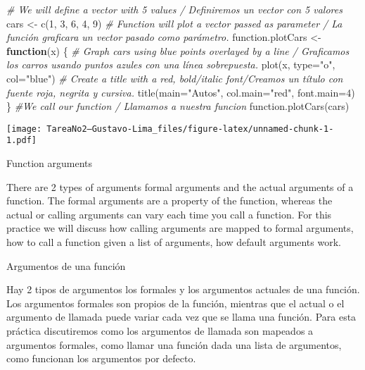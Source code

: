 \documentclass[
]{article}
\newenvironment{Shaded}{\begin{snugshade}}{\end{snugshade}}
\newcommand{\AttributeTok}[1]{\textcolor[rgb]{0.77,0.63,0.00}{#1}}
\newcommand{\CommentTok}[1]{\textcolor[rgb]{0.56,0.35,0.01}{\textit{#1}}}
\newcommand{\ControlFlowTok}[1]{\textcolor[rgb]{0.13,0.29,0.53}{\textbf{#1}}}
\newcommand{\DecValTok}[1]{\textcolor[rgb]{0.00,0.00,0.81}{#1}}
\newcommand{\FunctionTok}[1]{\textcolor[rgb]{0.00,0.00,0.00}{#1}}
\newcommand{\NormalTok}[1]{#1}
\newcommand{\OtherTok}[1]{\textcolor[rgb]{0.56,0.35,0.01}{#1}}
\newcommand{\StringTok}[1]{\textcolor[rgb]{0.31,0.60,0.02}{#1}}
\begin{document}
\begin{Shaded}
\begin{Highlighting}[]
\CommentTok{\# We will define a vector with 5 values / Definiremos un vector con 5 valores}
\NormalTok{cars }\OtherTok{\textless{}{-}} \FunctionTok{c}\NormalTok{(}\DecValTok{1}\NormalTok{, }\DecValTok{3}\NormalTok{, }\DecValTok{6}\NormalTok{, }\DecValTok{4}\NormalTok{, }\DecValTok{9}\NormalTok{)}
\CommentTok{\# Function will plot a vector passed as parameter / La función graficara un vector pasado como parámetro.}
\NormalTok{function.plotCars }\OtherTok{\textless{}{-}} \ControlFlowTok{function}\NormalTok{(x) }
\NormalTok{\{}
  \CommentTok{\# Graph cars using blue points overlayed by a line / Graficamos los carros usando puntos azules con una línea sobrepuesta.}
  \FunctionTok{plot}\NormalTok{(x, }\AttributeTok{type=}\StringTok{"o"}\NormalTok{, }\AttributeTok{col=}\StringTok{"blue"}\NormalTok{)}
  \CommentTok{\# Create a title with a red, bold/italic font/Creamos un título con fuente roja, negrita y cursiva.}
  \FunctionTok{title}\NormalTok{(}\AttributeTok{main=}\StringTok{"Autos"}\NormalTok{, }\AttributeTok{col.main=}\StringTok{"red"}\NormalTok{, }\AttributeTok{font.main=}\DecValTok{4}\NormalTok{)}
\NormalTok{\}}
\CommentTok{\#We call our function / Llamamos a nuestra funcion}
\FunctionTok{function.plotCars}\NormalTok{(cars)}
\end{Highlighting}
\end{Shaded}

\texttt{[image: TareaNo2---Gustavo-Lima\_files/figure-latex/unnamed-chunk-1-1.pdf]}

Function arguments

There are 2 types of arguments formal arguments and the actual arguments
of a function. The formal arguments are a property of the function,
whereas the actual or calling arguments can vary each time you call a
function. For this practice we will discuss how calling arguments are
mapped to formal arguments, how to call a function given a list of
arguments, how default arguments work.

Argumentos de una función

Hay 2 tipos de argumentos los formales y los argumentos actuales de una
función. Los argumentos formales son propios de la función, mientras que
el actual o el argumento de llamada puede variar cada vez que se llama
una función. Para esta práctica discutiremos como los argumentos de
llamada son mapeados a argumentos formales, como llamar una función dada
una lista de argumentos, como funcionan los argumentos por defecto.
\end{document}
